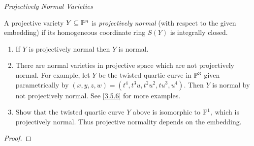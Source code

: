 \label{1.3.18}

\emph{Projectively Normal Varieties}

A projective variety $Y \subseteq \P^n$ is \emph{projectively normal} (with respect to the given embedding) if its homogeneous coordinate ring $S(Y)$ is integrally closed.

\begin{enumerate}[label = (\alph*)]
    \item If $Y$ is projectively normal then $Y$ is normal.

    \item There are normal varieties in projective space which are not projectively normal. For example, let $Y$ be the twisted quartic curve in $\P^3$ given parametrically by $(x, y, z, w) = (t^4, t^3 u, t^2 u^2, t u^3, u^4)$. Then $Y$ is normal by not projectively normal. See \ref{3.5.6} for more examples.

    \item Show that the twisted quartic curve $Y$ above is isomorphic to $\P^1$, which is projectively normal. Thus projective normality depends on the embedding.
\end{enumerate}

\begin{proof}

\end{proof}
